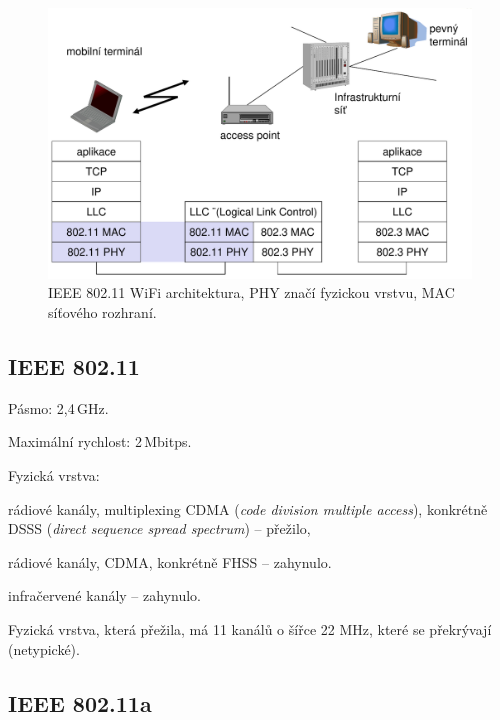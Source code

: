 \begin{figure}[H]
    \centering
    \includegraphics[width=0.75\linewidth]{wifi-architektura.pdf}
    \caption{IEEE 802.11 WiFi architektura, PHY značí fyzickou vrstvu, MAC síťového rozhraní.}
\end{figure}

\subsection{IEEE 802.11}

\begin{compactitem}
    \item Pásmo: 2,4\,GHz.

    \item Maximální rychlost: 2\,Mbitps.

    \item Fyzická vrstva: \begin{compactitem}
        \item rádiové kanály, multiplexing CDMA (\textit{code division multiple access}), konkrétně DSSS (\textit{direct sequence spread spectrum}) -- přežilo,
        \item rádiové kanály, CDMA, konkrétně FHSS -- zahynulo.
        \item infračervené kanály -- zahynulo.
    \end{compactitem}

    \item Fyzická vrstva, která přežila, má 11 kanálů o šířce 22 MHz, které se překrývají (netypické).
\end{compactitem}

\subsection{IEEE 802.11a}

